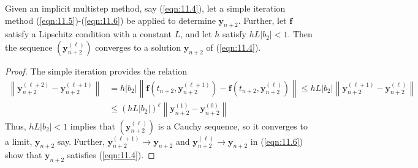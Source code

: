 \documentclass[a4paper]{article}
\begin{document}
\begin{lemma}
    Given an implicit multistep method, say (\ref{eqn:11.4}), let a simple iteration method (\ref{eqn:11.5})-(\ref{eqn:11.6}) be applied to determine $\mathbf{y}_{n+2}$. Further, let $\mathbf{f}$ satisfy a Lipschitz condition with a constant $L$, and let $h$ satisfy $h L\left|b_2\right|<1$. Then the sequence $(\mathbf{y}_{n+2}^{(\ell)})$ converges to a solution $\mathbf{y}_{n+2}$ of (\ref{eqn:11.4}).
\end{lemma}
\begin{proof}
    The simple iteration provides the relation
\[
\begin{aligned}
\left\|\mathbf{y}_{n+2}^{(\ell+2)}-\mathbf{y}_{n+2}^{(\ell+1)}\right\| & =h\left|b_2\right|\left\|\mathbf{f}\left(t_{n+2}, \mathbf{y}_{n+2}^{(\ell+1)}\right)-\mathbf{f}\left(t_{n+2}, \mathbf{y}_{n+2}^{(\ell)}\right)\right\| \leq h L\left|b_2\right|\left\|\mathbf{y}_{n+2}^{(\ell+1)}-\mathbf{y}_{n+2}^{(\ell)}\right\| \\
& \leq\left(h L\left|b_2\right|\right)^{\ell}\left\|\mathbf{y}_{n+2}^{(1)}-\mathbf{y}_{n+2}^{(0)}\right\|
\end{aligned}
\]
Thus, $h L\left|b_2\right|<1$ implies that $(\mathbf{y}_{n+2}^{(\ell)})$ is a Cauchy sequence, so it converges to a limit, $\mathbf{y}_{n+2}$ say. Further, $\mathbf{y}_{n+2}^{(\ell+1)} \rightarrow \mathbf{y}_{n+2}$ and $\mathbf{y}_{n+2}^{(\ell)} \rightarrow \mathbf{y}_{n+2}$ in (\ref{eqn:11.6}) show that $\mathbf{y}_{n+2}$ satisfies (\ref{eqn:11.4}).
\end{proof}
\end{document}
